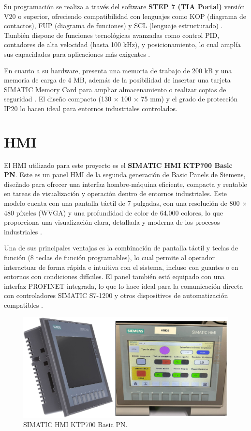 Su programación se realiza a través del software \textbf{STEP 7 (TIA Portal)} versión V20 o superior, ofreciendo compatibilidad con lenguajes como KOP (diagrama de contactos), FUP (diagrama de funciones) y SCL (lenguaje estructurado) \cite{PLC_siemens}. También dispone de funciones tecnológicas avanzadas como control PID, contadores de alta velocidad (hasta 100 kHz), y posicionamiento, lo cual amplía sus capacidades para aplicaciones más exigentes \cite{PLC_siemens}.

En cuanto a su hardware, presenta una memoria de trabajo de 200 kB y una memoria de carga de 4 MB, además de la posibilidad de insertar una tarjeta SIMATIC Memory Card para ampliar almacenamiento o realizar copias de seguridad \cite{PLC_siemens}. El diseño compacto (130 × 100 × 75 mm) y el grado de protección IP20 lo hacen ideal para entornos industriales controlados.

\section{HMI}
\label{sec:hmi}

El HMI utilizado para este proyecto es el \textbf{SIMATIC HMI KTP700 Basic PN}. Este es un panel HMI de la segunda generación de Basic Panels de Siemens, diseñado para ofrecer una interfaz hombre-máquina eficiente, compacta y rentable en tareas de visualización y operación dentro de entornos industriales. Este modelo cuenta con una pantalla táctil de 7 pulgadas, con una resolución de 800 × 480 píxeles (WVGA) y una profundidad de color de 64.000 colores, lo que proporciona una visualización clara, detallada y moderna de los procesos industriales \cite{HMI_KTP}.

Una de sus principales ventajas es la combinación de pantalla táctil y teclas de función (8 teclas de función programables), lo cual permite al operador interactuar de forma rápida e intuitiva con el sistema, incluso con guantes o en entornos con condiciones difíciles. El panel también está equipado con una interfaz PROFINET integrada, lo que lo hace ideal para la comunicación directa con controladores SIMATIC S7-1200 y otros dispositivos de automatización compatibles \cite{HMI_KTP}.

\begin{figure} [h!]
  \begin{center}
    \includegraphics[width=15cm]{figs/HMI_cap_3}
  \end{center}
  \caption{\centering SIMATIC HMI KTP700 Basic PN.}
  \label{fig:HMI_cap_3}
\end{figure} 


